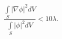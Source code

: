 \begin{equation}
\frac{\int\limits_S\vert\nabla\phi\vert^{2} dV}
{\int\limits_S \vert\phi\vert^{2} dV}  < 10 \lambda.
\end{equation}

